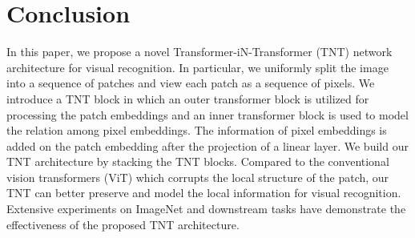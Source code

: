 \documentclass{article}
\begin{document}
\section{Conclusion}
In this paper, we propose a novel Transformer-iN-Transformer (TNT) network architecture for visual recognition. In particular, we uniformly split the image into a sequence of patches and view each patch as a sequence of pixels. We introduce a TNT block in which an outer transformer block is utilized for processing the patch embeddings and an inner transformer block is used to model the relation among pixel embeddings. The information of pixel embeddings is added on the patch embedding after the projection of a linear layer. We build our TNT architecture by stacking the TNT blocks. Compared to the conventional vision transformers (ViT) which corrupts the local structure of the patch, our TNT can better preserve and model the local information for visual recognition. Extensive experiments on ImageNet and downstream tasks have demonstrate the effectiveness of the proposed TNT architecture.



\end{document}
